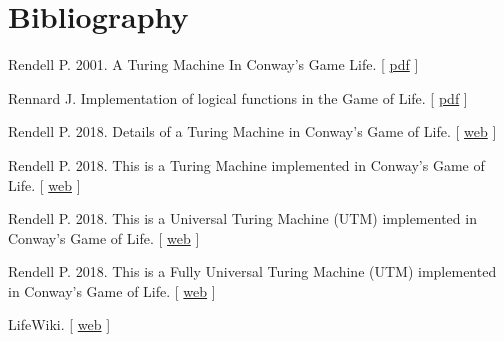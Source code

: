 \documentclass{article}
\begin{document}
\section*{Bibliography}


\noindent 
  Rendell P. 2001. A Turing Machine In Conway's Game Life. [
\href{https://www.ics.uci.edu/~welling/teaching/271fall09/Turing-Machine-Life.pdf}{pdf}
]
  

\vspace*{0.2cm}


\noindent 
  Rennard J. Implementation of logical functions in the Game of Life. [
\href{http://www.rennard.org/alife/CollisionBasedRennard.pdf}{pdf}
]
  

\vspace*{0.2cm}


\noindent 
  Rendell P. 2018. Details of a Turing Machine in Conway's Game of Life. [
\href{http://rendell-attic.org/gol/tmdetails.htm}{web}
]
  

\vspace*{0.2cm}


\noindent 
  Rendell P. 2018. This is a Turing Machine implemented in Conway's Game of Life. [
\href{http://rendell-attic.org/gol/tm.htm}{web}
]
  

\vspace*{0.2cm}


\noindent 
  Rendell P. 2018. This is a Universal Turing Machine (UTM) implemented in Conway's Game of Life. [
\href{http://rendell-attic.org/gol/utm/index.htm}{web}
]
  

\vspace*{0.2cm}


\noindent 
  Rendell P. 2018. This is a Fully Universal Turing Machine (UTM) implemented in Conway's Game of Life. [
\href{http://rendell-attic.org/gol/fullutm/index.htm}{web}
]
  

\vspace*{0.2cm}


\noindent 
  LifeWiki. [
\href{http://www.conwaylife.com/wiki/}{web}
]
  

\vspace*{0.2cm}
\end{document}
